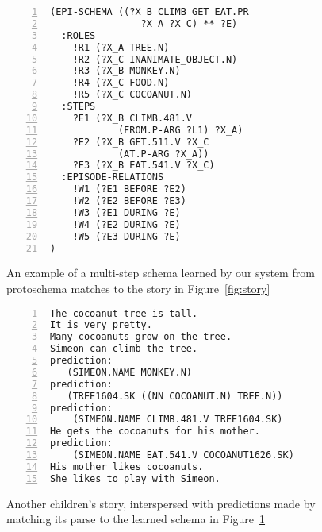 \begin{figure}[htbp]
    \begin{lstlisting}[frame=single,numbers=left,numberstyle=\tiny,xleftmargin=1.5em,style=Schemas]
(EPI-SCHEMA ((?X_B CLIMB_GET_EAT.PR
                ?X_A ?X_C) ** ?E)
  :ROLES
    !R1 (?X_A TREE.N)
    !R2 (?X_C INANIMATE_OBJECT.N)
    !R3 (?X_B MONKEY.N)
    !R4 (?X_C FOOD.N)
    !R5 (?X_C COCOANUT.N)
  :STEPS
    ?E1 (?X_B CLIMB.481.V
            (FROM.P-ARG ?L1) ?X_A)
    ?E2 (?X_B GET.511.V ?X_C
            (AT.P-ARG ?X_A))
    ?E3 (?X_B EAT.541.V ?X_C)
  :EPISODE-RELATIONS
    !W1 (?E1 BEFORE ?E2)
    !W2 (?E2 BEFORE ?E3)
    !W3 (?E1 DURING ?E)
    !W4 (?E2 DURING ?E)
    !W5 (?E3 DURING ?E)
)\end{lstlisting}
    \caption{An example of a multi-step schema learned by our system from protoschema matches to the story in Figure~\ref{fig:story}}
    \label{fig:eg_schema}
\end{figure}


\begin{figure}[htbp]
    \begin{lstlisting}[frame=single,numbers=left,numberstyle=\tiny,xleftmargin=1.5em,style=Schemas2]
The cocoanut tree is tall.
It is very pretty.
Many cocoanuts grow on the tree.
Simeon can climb the tree.
prediction:
   (SIMEON.NAME MONKEY.N)
prediction:
   (TREE1604.SK ((NN COCOANUT.N) TREE.N))
prediction:
    (SIMEON.NAME CLIMB.481.V TREE1604.SK)
He gets the cocoanuts for his mother.
prediction:
    (SIMEON.NAME EAT.541.V COCOANUT1626.SK)
His mother likes cocoanuts.
She likes to play with Simeon.\end{lstlisting}
    \caption{Another children's story, interspersed with predictions made by matching its parse to the learned schema in Figure~\ref{fig:eg_schema}}
    \label{fig:predictions}
\end{figure}
\fi